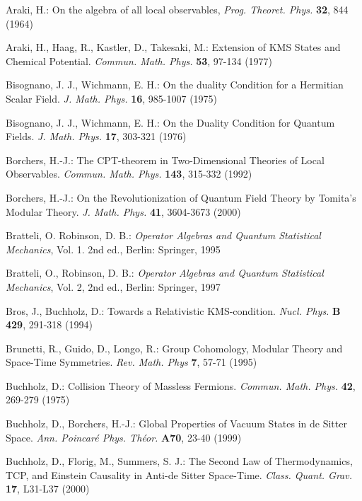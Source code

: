 \documentclass[a4paper,11pt]{article}
\begin{document}
\begin{thebibliography}{*****}

 Araki, H.: On the algebra of all local observables,
{\it Prog. Theoret. Phys.} {\bf 32}, 844 (1964)

 Araki, H., Haag, R., Kastler, D., Takesaki, M.: Extension of
KMS States and Chemical Potential. {\it Commun. Math. Phys.} {\bf 53}, 97-134 (1977)


 Bisognano, J. J., Wichmann, E. H.: On the duality Condition
for a Hermitian Scalar Field. {\it J. Math. Phys.} {\bf 16}, 985-1007 (1975)

 Bisognano, J. J., Wichmann, E. H.: On the Duality Condition
for Quantum Fields. {\it J. Math. Phys.} {\bf 17}, 303-321 (1976)


 Borchers, H.-J.: The CPT-theorem in Two-Dimensional Theories
of Local Observables. {\it Commun. Math. Phys.} {\bf 143}, 315-332 (1992)

 Borchers, H.-J.:
On the Revolutionization of Quantum Field Theory
by Tomita's Modular Theory. {\it J. Math. Phys.} {\bf 41},
3604-3673 (2000)

 Bratteli, O. Robinson, D. B.: {\it Operator Algebras and
Quantum Statistical Mechanics}, Vol. 1. 2nd ed., Berlin: Springer, 1995

 Bratteli, O., Robinson, D. B.: {\it Operator Algebras and
Quantum Statistical Mechanics}, Vol. 2, 2nd ed., Berlin: Springer, 1997

 Bros, J., Buchholz, D.: Towards a Relativistic KMS-condition.
{\it Nucl. Phys.} {\bf B 429}, 291-318 (1994)

 Brunetti, R., Guido, D., Longo, R.: Group Cohomology,
Modular Theory
and Space-Time Symmetries. {\it Rev. Math. Phys} {\bf 7}, 57-71 (1995)

 Buchholz, D.: Collision Theory of Massless Fermions.
{\it Commun. Math. Phys.} {\bf 42}, 269-279 (1975)



 Buchholz, D., Borchers, H.-J.: Global Properties of Vacuum
States in de Sitter Space. {\it Ann. Poincar\'e Phys. Th\'eor.} {\bf A70}, 23-40 (1999)

 Buchholz, D., Florig, M., Summers, S. J.: The Second
Law of Thermodynamics, TCP, and Einstein Causality in Anti-de Sitter
Space-Time. {\it Class. Quant. Grav.} {\bf 17}, L31-L37 (2000)


\end{thebibliography}
\end{document}
